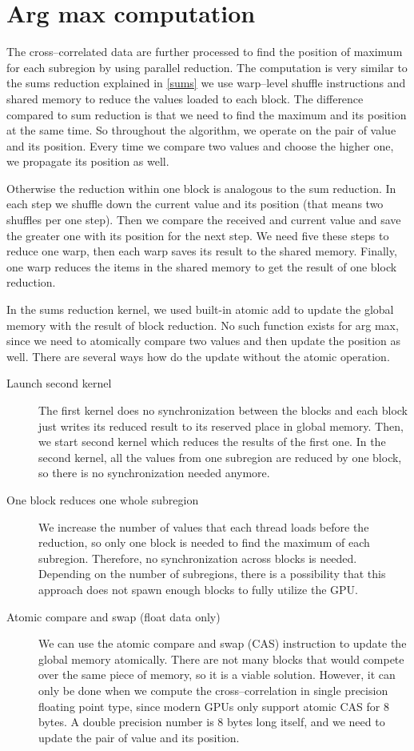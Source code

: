 \section{Arg max computation}
The cross--correlated data are further processed to find the position of maximum for each subregion by using parallel reduction. The computation is very similar to the sums reduction explained in \cref{sums} we use warp--level shuffle instructions and shared memory to reduce the values loaded to each block. The difference compared to sum reduction is that we need to find the maximum and its position at the same time. So throughout the algorithm, we operate on the pair of value and its position. Every time we compare two values and choose the higher one, we propagate its position as well.

Otherwise the reduction within one block is analogous to the sum reduction. In each step we shuffle down the current value and its position (that means two shuffles per one step). Then we compare the received and current value and save the greater one with its position for the next step. We need five these steps to reduce one warp, then each warp saves its result to the shared memory. Finally, one warp reduces the items in the shared memory to get the result of one block reduction.

In the sums reduction kernel, we used built-in atomic add to update the global memory with the result of block reduction. No such function exists for arg max, since we need to atomically compare two values and then update the position as well. There are several ways how do the update without the atomic operation.

\begin{description}
	\item[Launch second kernel] The first kernel does no synchronization between the blocks and each block just writes its reduced result to its reserved place in global memory. Then, we start second kernel which reduces the results of the first one. In the second kernel, all the values from one subregion are reduced by one block, so there is no synchronization needed anymore. 
	\item[One block reduces one whole subregion] We increase the number of values that each thread loads before the reduction, so only one block is needed to find the maximum of each subregion. Therefore, no synchronization across blocks is needed. Depending on the number of subregions, there is a possibility that this approach does not spawn enough blocks to fully utilize the GPU.
	\item[Atomic compare and swap (float data only)] We can use the atomic compare and swap (CAS) instruction to update the global memory atomically. There are not many blocks that would compete over the same piece of memory, so it is a viable solution. However, it can only be done when we compute the cross--correlation in single precision floating point type, since modern GPUs only support atomic CAS for 8 bytes. A double precision number is 8 bytes long itself, and we need to update the pair of value and its position.
\end{description}


